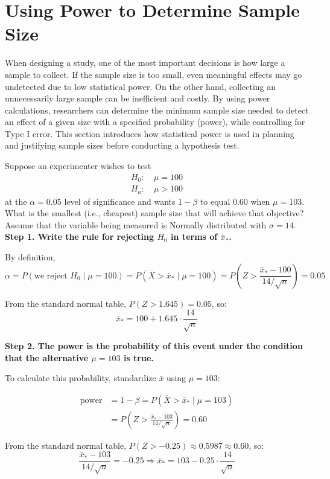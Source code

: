 \section{Using Power to Determine Sample Size}
When designing a study, one of the most important decisions is how large a sample to collect. If the sample size is too small, even meaningful effects may go undetected due to low statistical power. On the other hand, collecting an unnecessarily large sample can be inefficient and costly. By using power calculations, researchers can determine the minimum sample size needed to detect an effect of a given size with a specified probability (power), while controlling for Type I error. This section introduces how statistical power is used in planning and justifying sample sizes before conducting a hypothesis test.
\begin{example}
Suppose an experimenter wishes to test
\begin{align*}
H_0\!:&\ \mu = 100 \\
H_a\!:&\ \mu > 100
\end{align*}
at the $\alpha = 0.05$ level of significance and wants $1 - \beta$ to equal 0.60 when $\mu = 103$. What is the smallest (i.e., cheapest) sample size that will achieve that objective? Assume that the variable being measured is Normally distributed with $\sigma = 14$. \\
\textbf{Step 1. Write the rule for rejecting $H_0$ in terms of $\bar{x}_*$.}

By definition,
\[
\alpha = P(\text{we reject } H_0 \mid \mu = 100)
= P\left( \bar{X} > \bar{x}_* \mid \mu = 100 \right)
= P\left( Z > \frac{\bar{x}_* - 100}{14 / \sqrt{n}} \right) = 0.05
\]

From the standard normal table, $P(Z > 1.645) = 0.05$, so:
\[
\bar{x}_* = 100 + 1.645 \cdot \frac{14}{\sqrt{n}}
\]

\vspace{1em}
\textbf{Step 2. The power is the probability of this event under the condition that the alternative $\mu = 103$ is true.}

To calculate this probability, standardize $\bar{x}$ using $\mu = 103$:

\[
\begin{aligned}
\text{power} &= 1 - \beta = P(\bar{X} > \bar{x}_* \mid \mu = 103) \\
&= P\left( Z > \frac{\bar{x}_* - 103}{14 / \sqrt{n}} \right) = 0.60
\end{aligned}
\]

From the standard normal table, $P(Z > -0.25) \approx 0.5987 \approx 0.60$, so:
\[
\frac{\bar{x}_* - 103}{14 / \sqrt{n}} = -0.25
\Rightarrow
\bar{x}_* = 103 - 0.25 \cdot \frac{14}{\sqrt{n}}
\]


\end{example}
